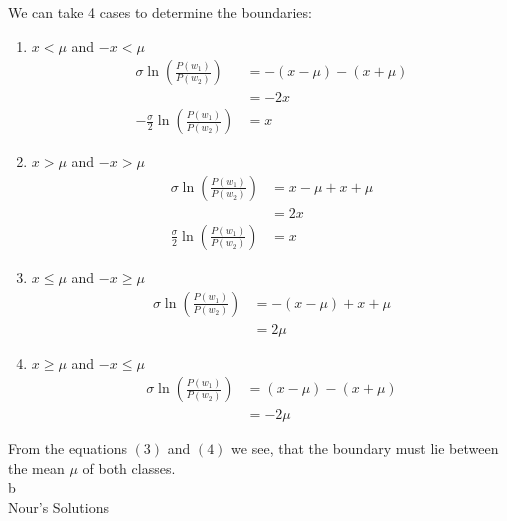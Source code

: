 \documentclass[a4paper]{article}
\begin{document}
We can take 4 cases to determine the boundaries:
\begin{enumerate}
	\item $x < \mu$ and $-x < \mu$ \\
	\begin{align*}
	\sigma\ln\left(\frac{P(w_1)}{P(w_2)}\right) &= -(x - \mu) - (x + \mu ) \\
	&= -2x \\
	- \frac{\sigma}{2}\ln\left(\frac{P(w_1)}{P(w_2)}\right) &= x
	\end{align*}
	\item $x > \mu$ and $-x > \mu$ \\
	\begin{align*}
	\sigma\ln\left(\frac{P(w_1)}{P(w_2)}\right) &= x - \mu + x + \mu \\
	&= 2x \\
	\frac{\sigma}{2}\ln\left(\frac{P(w_1)}{P(w_2)}\right) &= x
	\end{align*}		
	
	\item $x \le \mu$ and $-x \geq \mu$ \\
	\begin{align*}
	\sigma\ln\left(\frac{P(w_1)}{P(w_2)}\right) &= -(x - \mu) + x + \mu \\
	&= 2\mu
	\end{align*}
	\item $x \geq \mu$ and $-x \le \mu$ \\
	\begin{align*}
	\sigma\ln\left(\frac{P(w_1)}{P(w_2)}\right) &= (x - \mu) - (x + \mu ) \\
	&= -2\mu
	\end{align*}
\end{enumerate}

From the equations $(3)$ and $(4)$  we see, that the boundary must lie between the mean $\mu$ of both classes.\\

b\\ Nour's Solutions
\end{document}
